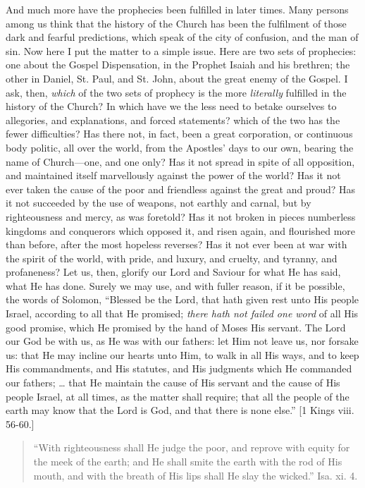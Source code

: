 And much more have the prophecies been fulfilled in later times.
Many persons among us think that the history of the Church has been
the fulfilment of those dark and fearful predictions, which speak of
the city of confusion, and the man of sin. Now here I put the matter
to a simple issue. Here are two sets of prophecies: one about the
Gospel Dispensation, in the Prophet Isaiah and his brethren; the other
in Daniel, St. Paul, and St. John, about the great enemy of the
Gospel. I ask, then, \emph{which} of the two sets of prophecy is the more
\emph{literally} fulfilled in the history of the Church? In which have we the
less need to betake ourselves to allegories, and explanations, and
forced statements? which of the two has the fewer difficulties? Has
there not, in fact, been a great corporation, or continuous body
politic, all over the world, from the Apostles' days to our own,
bearing the name of Church—one, and one only? Has it not spread in
spite of all opposition, and maintained itself marvellously against
the power of the world? Has it not ever taken the cause of the poor
and friendless against the great and proud? Has it not succeeded by
the use of weapons, not earthly and carnal, but by righteousness and
mercy, as was foretold? Has it not broken in pieces numberless
kingdoms and conquerors which opposed it, and risen again, and
flourished more than before, after the most hopeless reverses? Has it
not ever been at war with the spirit of the world, with pride, and
luxury, and cruelty, and tyranny, and profaneness? Let us, then,
glorify our Lord and Saviour for what He has said, what He has done.
Surely we may use, and with fuller reason, if it be possible, the
words of Solomon, ``Blessed be the Lord, that hath given rest unto
His people Israel, according to all that He promised; \emph{there hath
not failed one word} of all His good promise, which He promised by
the hand of Moses His servant. The Lord our God be with us, as He was
with our fathers: let Him not leave us, nor forsake us: that He may
incline our hearts unto Him, to walk in all His ways, and to keep His
commandments, and His statutes, and His judgments which He commanded
our fathers; … that He maintain the cause of His servant and the
cause of His people Israel, at all times, as the matter shall require;
that all the people of the earth may know that the Lord is God, and
that there is none else.'' [1 Kings viii. 56-60.]


\begin{quote}

``With righteousness shall He judge the poor, and reprove
with equity for the meek of the earth; and He shall smite the earth
with the rod of His mouth, and with the breath of His lips shall He
slay the wicked.'' Isa. xi. 4.

\end{quote}

